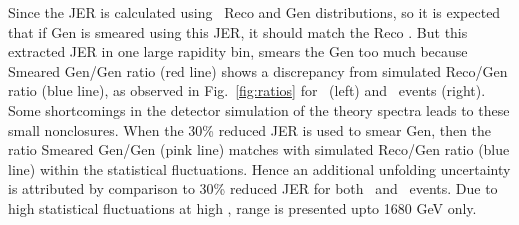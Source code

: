 
Since the JER is calculated using \MGP~Reco and Gen \httwo distributions, so it is expected that if Gen \httwo is smeared using this JER, it should match the Reco \httwo. But this extracted JER in one large rapidity bin, smears the Gen \httwo too much because Smeared Gen/Gen ratio (red line) shows a discrepancy from simulated Reco/Gen ratio (blue line), as observed in Fig.~\ref{fig:ratios} for \njt~(left) and \njth~events (right). Some shortcomings in the detector simulation of the theory spectra leads to these small nonclosures. When the 30\% reduced JER  is used to smear Gen, then the ratio Smeared Gen/Gen (pink line) matches with simulated Reco/Gen ratio (blue line) within the statistical fluctuations. Hence an additional unfolding uncertainty is attributed by comparison to 30\% reduced JER for both \njt~and \njth~events. Due to high statistical fluctuations at high \httwons, range is presented upto 1680 GeV only.

